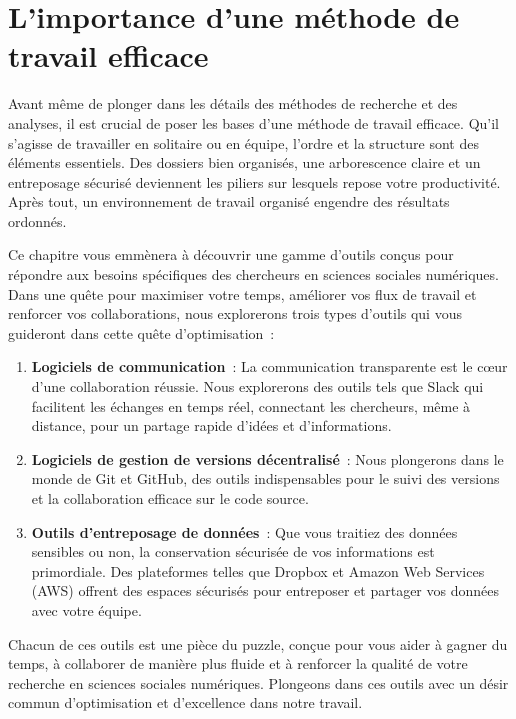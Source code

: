 \documentclass[
  letterpaper,
]{scrbook}
\begin{document}
\hypertarget{limportance-dune-muxe9thode-de-travail-efficace}{%
\section{L'importance d'une méthode de travail
efficace}\label{limportance-dune-muxe9thode-de-travail-efficace}}

Avant même de plonger dans les détails des méthodes de recherche et des
analyses, il est crucial de poser les bases d'une méthode de travail
efficace. Qu'il s'agisse de travailler en solitaire ou en équipe,
l'ordre et la structure sont des éléments essentiels. Des dossiers bien
organisés, une arborescence claire et un entreposage sécurisé deviennent
les piliers sur lesquels repose votre productivité. Après tout, un
environnement de travail organisé engendre des résultats ordonnés.

Ce chapitre vous emmènera à découvrir une gamme d'outils conçus pour
répondre aux besoins spécifiques des chercheurs en sciences sociales
numériques. Dans une quête pour maximiser votre temps, améliorer vos
flux de travail et renforcer vos collaborations, nous explorerons trois
types d'outils qui vous guideront dans cette quête d'optimisation~:

\begin{enumerate}
\def\labelenumi{\arabic{enumi}.}
\item
  \textbf{Logiciels de communication}~: La communication transparente
  est le cœur d'une collaboration réussie. Nous explorerons des outils
  tels que Slack qui facilitent les échanges en temps réel, connectant
  les chercheurs, même à distance, pour un partage rapide d'idées et
  d'informations.
\item
  \textbf{Logiciels de gestion de versions décentralisé}~: Nous
  plongerons dans le monde de Git et GitHub, des outils indispensables
  pour le suivi des versions et la collaboration efficace sur le code
  source.
\item
  \textbf{Outils d'entreposage de données}~: Que vous traitiez des
  données sensibles ou non, la conservation sécurisée de vos
  informations est primordiale. Des plateformes telles que Dropbox et
  Amazon Web Services (AWS) offrent des espaces sécurisés pour
  entreposer et partager vos données avec votre équipe.
\end{enumerate}

Chacun de ces outils est une pièce du puzzle, conçue pour vous aider à
gagner du temps, à collaborer de manière plus fluide et à renforcer la
qualité de votre recherche en sciences sociales numériques. Plongeons
dans ces outils avec un désir commun d'optimisation et d'excellence dans
notre travail.
\end{document}

